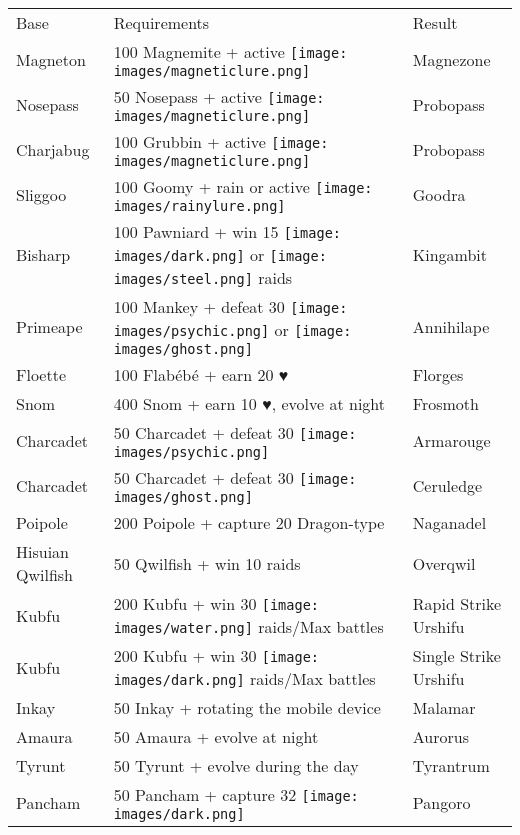 \begin{table}
\footnotesize
\centering
\begin{tabular}{lll}
  Base & Requirements & Result \\
  \Midrule
  Magneton & 100 Magnemite + active \texttt{[image: images/magneticlure.png]} & Magnezone\\
  Nosepass & 50 Nosepass + active \texttt{[image: images/magneticlure.png]} & Probopass\\
  Charjabug & 100 Grubbin + active \texttt{[image: images/magneticlure.png]} & Probopass\\
  Sliggoo	& 100 Goomy + rain or active \texttt{[image: images/rainylure.png]}& Goodra\\
  Bisharp	& 100 Pawniard + win 15 \texttt{[image: images/dark.png]} or \texttt{[image: images/steel.png]} raids & Kingambit\\
  Primeape & 100 Mankey + defeat 30 \texttt{[image: images/psychic.png]} or \texttt{[image: images/ghost.png]} & Annihilape\\
  Floette	& 100 Flabébé + earn 20 ♥ & Florges\\
  Snom & 400 Snom + earn 10 ♥, evolve at night & Frosmoth \\
  Charcadet	& 50 Charcadet + defeat 30 \texttt{[image: images/psychic.png]}& Armarouge\\
  Charcadet	& 50 Charcadet + defeat 30 \texttt{[image: images/ghost.png]}& Ceruledge\\
  Poipole & 200 Poipole + capture 20 Dragon-type & Naganadel\\
  Hisuian Qwilfish & 50 Qwilfish + win 10 raids & Overqwil\\
  Kubfu	& 200 Kubfu + win 30 \texttt{[image: images/water.png]} raids/Max battles & Rapid Strike Urshifu\\
  Kubfu	& 200 Kubfu + win 30 \texttt{[image: images/dark.png]} raids/Max battles & Single Strike Urshifu\\
  Inkay	& 50 Inkay + rotating the mobile device & Malamar\\
  Amaura & 50 Amaura + evolve at night & Aurorus\\
  Tyrunt & 50 Tyrunt + evolve during the day & Tyrantrum\\
  Pancham	& 50 Pancham + capture 32 \texttt{[image: images/dark.png]} & Pangoro\\

\end{tabular}
\end{table}

